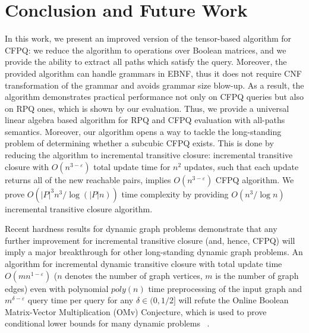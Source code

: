 \section{Conclusion and Future Work}

In this work, we present an improved version of the tensor-based algorithm for CFPQ: we reduce the algorithm to operations over Boolean matrices, and we provide the ability to extract all paths which satisfy the query.
Moreover, the provided algorithm can handle grammars in EBNF, thus it does not require CNF transformation of the grammar and avoids grammar size blow-up.
As a result, the algorithm demonstrates practical performance not only on CFPQ queries but also on RPQ ones, which is shown by our evaluation.
Thus, we provide a universal linear algebra based algorithm for RPQ and CFPQ evaluation with all-paths semantics.
Moreover, our algorithm opens a way to tackle the long-standing problem of determining whether a subcubic CFPQ exists.
This is done by reducing the algorithm to incremental transitive closure: incremental transitive closure with $O(n^{3-\varepsilon})$ total update time for $n^2$ updates, such that each update returns all of the new reachable pairs, implies $O(n^{3-\varepsilon})$ CFPQ algorithm.
We prove $O({|P|}^3n^3/\log (|P|n))$ time complexity by providing $O(n^3/\log{n})$ incremental transitive closure algorithm.


Recent hardness results for dynamic graph problems demonstrate that any further improvement for incremental transitive closure (and, hence, CFPQ) will imply a major breakthrough for other long-standing dynamic graph problems. An algorithm for incremental dynamic transitive closure with total update time $O(mn^{1-\varepsilon})$ ($n$ denotes the number of graph vertices, $m$ is the number of graph edges) even with polynomial $poly(n)$ time preprocessing of the input graph and $m^{\delta - \varepsilon}$ query time per query for any $\delta \in (0, 1/2]$ will refute the Online Boolean Matrix-Vector Multiplication (OMv) Conjecture, which is used to prove conditional lower bounds for many dynamic problems ~\citep{8948597, 10.1145/2746539.2746609}.


